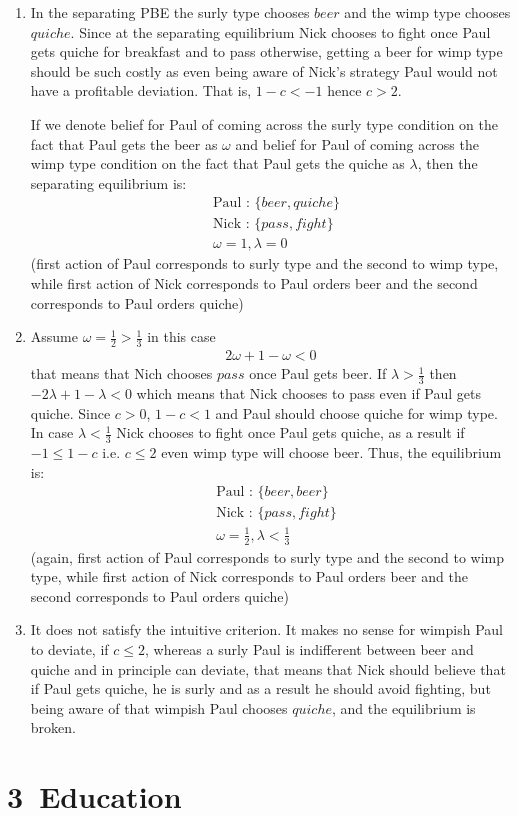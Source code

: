 \documentclass[a4paper]{article}
\begin{document}
\begin{enumerate}
	\item In the separating PBE the surly type chooses $beer$ and the wimp type chooses $quiche$. Since at the separating equilibrium Nick chooses to fight once Paul gets quiche for breakfast and to pass otherwise, getting a beer for wimp type should be such costly as even being aware of Nick's strategy Paul would not have a profitable deviation. That is, $1 - c < -1$ hence $c > 2$.
	
	If we denote belief for Paul of coming across the surly type condition on the fact that Paul gets the beer as $\omega$ and  belief for Paul of coming across the wimp type condition on the fact that Paul gets the quiche as $\lambda$, then the separating equilibrium is:
	\begin{align*}
	&\text{Paul : } \{beer, quiche\}\\
	&\text{Nick : } \{pass, fight\}\\
	& \omega = 1, \lambda = 0
	\end{align*}
	(first action of Paul corresponds to surly type and the second to wimp type, while first action of Nick corresponds to Paul orders beer and the second corresponds to Paul orders quiche)
	\item Assume $\omega = \frac{1}{2} > \frac{1}{3}$ in this case
	\begin{align*}
	2\omega + 1 - \omega < 0
	\end{align*}
	that means that Nich chooses $pass$ once Paul gets beer. If $\lambda > \frac{1}{3}$ then $-2\lambda + 1 - \lambda < 0$ which means that Nick chooses to pass even if Paul gets quiche. Since $c > 0$, $1 - c < 1$ and Paul should choose quiche for wimp type. In case $\lambda < \frac{1}{3}$ Nick chooses to fight once Paul gets quiche, as a result if $-1 \le 1 - c$ i.e. $c \le 2$ even wimp type will choose beer.
	Thus, the equilibrium is:
	\begin{align*}
	&\text{Paul : } \{beer, beer\}\\
	&\text{Nick : } \{pass, fight\}\\
	& \omega = \frac{1}{2}, \lambda < \frac{1}{3}
	\end{align*}
	(again, first action of Paul corresponds to surly type and the second to wimp type, while first action of Nick corresponds to Paul orders beer and the second corresponds to Paul orders quiche)
	\item It does not satisfy the intuitive criterion. It makes no sense for wimpish Paul to deviate, if $c \le 2$, whereas a surly Paul is indifferent between beer and quiche and in principle can deviate, that means that Nick should believe that if Paul gets quiche, he is surly and as a result he should avoid fighting, but being aware of that wimpish Paul chooses $quiche$, and the equilibrium is broken.
\end{enumerate}
\section*{3\ Education}
\end{document}
